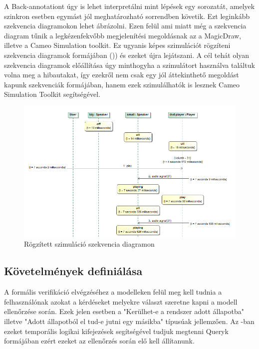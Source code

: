 A Back-annotationt úgy is lehet interpretálni mint lépések egy sorozatát, amelyek szinkron esetben egymást jól meghatározható sorrendben követik. Ezt leginkább szekvencia diagramokon lehet ábrázolni. Ezen felül ami miatt még a szekvencia diagram tűnik a legkézenfekvőbb megjelenítési megoldásnak az a MagicDraw, illetve a Cameo Simulation toolkit. Ez ugyanis képes szimulációt rögzíteni szekvencia diagramok formájában ()) és ezeket újra lejátszani. A cél tehát olyan szekvencia diagramok előállítása úgy minthogyha a szimulátort használva találtuk volna meg a hibautakat, így ezekről nem csak egy jól áttekinthető megoldást kapunk szekvenciák formájában, hanem ezek szimulálhatók is lesznek Cameo Simulation Toolkit segítségével.

\begin{figure}[!ht]
	\centering
	\includegraphics[width=140mm, keepaspectratio]{figures/contribution/md-cameo-rec.png}
	\caption[]{Rögzített szimuláció szekvencia diagramon\footnotemark}
	\label{fig:md-cameo-rec}
\end{figure}


\subsection{Követelmények definiálása}

A formális verifikáció elvégzéséhez a modelleken felül meg kell tudnia a felhasználónak azokat a kérdéseket melyekre választ szeretne kapni a modell ellenőrzése során. Ezek jelen esetben a "Kerülhet-e a rendszer adott állapotba" illetve "Adott állapotból el tud-e jutni egy másikba" típusúak jellemzően. Az \uppaal-ban ezeket temporális logikai kifejezések segítségével tudjuk megtenni \uppaal Queryk formájában ezért ezeket az ellenőrzés során elő kell állítanunk.


